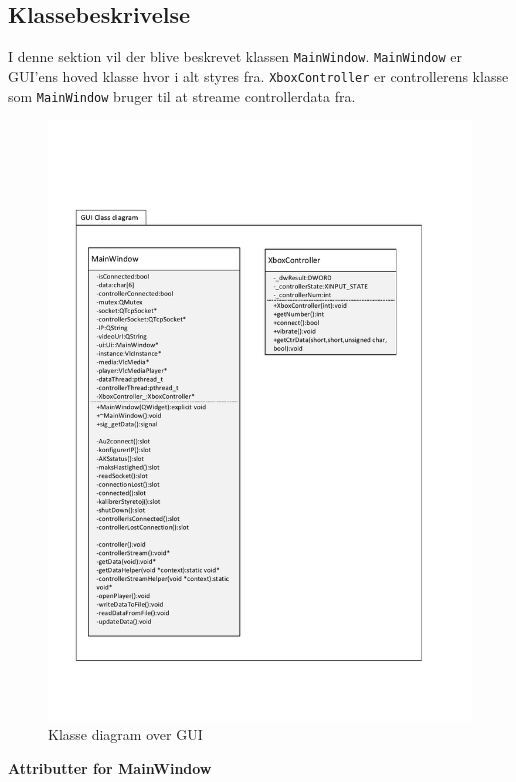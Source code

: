 \clearpage

\subsection{Klassebeskrivelse}
I denne sektion vil der blive beskrevet klassen \texttt{MainWindow}. \texttt{MainWindow} er GUI'ens hoved klasse hvor i alt styres fra. \texttt{XboxController} er controllerens klasse som \texttt{MainWindow} bruger til at streame controllerdata fra.

\begin{figure}[H]
\centering
\includegraphics[width=\textwidth* 9/10]{../fig/diagrammer/pc/gui_classdiagram.pdf}
\caption{Klasse diagram over GUI}
\label{fig:cd_gui}
\end{figure}
\clearpage
\textbf{Attributter for MainWindow}

